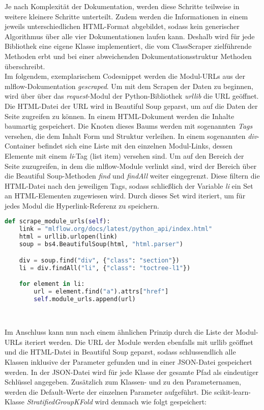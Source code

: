\documentclass[german,bachelor]{swsLeipzig}
\begin{document}
Je nach Komplexität der Dokumentation, werden diese Schritte teilweise in weitere kleinere Schritte unterteilt.
Zudem werden die Informationen in einem jeweils unterschiedlichen HTML-Format abgebildet,
sodass kein generischer Algorithmus über alle vier Dokumentationen laufen kann.
Deshalb wird für jede Bibliothek eine eigene Klasse implementiert, die vom ClassScraper zielführende Methoden erbt und
bei einer abweichenden Dokumentationsstruktur Methoden überschreibt. \\

Im folgendem, exemplarischem Codesnippet werden die Modul-URLs aus der mlflow-Dokumentation \textit{gescraped}.
Um mit dem Scrapen der Daten zu beginnen, wird über über das \textit{request}-Modul der Python-Bibliothek \textit{urllib} die URL geöffnet.
Die HTML-Datei der URL wird in Beautiful Soup geparst, um auf die Daten der Seite zugreifen zu können.
In einem HTML-Dokument werden die Inhalte baumartig gespeichert.
Die Knoten dieses Baums werden mit sogenannten \textit{Tags} versehen, die dem Inhalt Form und Struktur verleihen.
In einem sogenannten \textit{div}-Container befindet sich eine Liste mit den einzelnen Modul-Links, dessen Elemente mit
einem \textit{li}-Tag (list item) versehen sind.
Um auf den Bereich der Seite zuzugreifen, in dem die mlflow-Module verlinkt sind, wird der Bereich über die Beautiful Soup-Methoden
\textit{find} und \textit{findAll} weiter eingegrenzt.
Diese filtern die HTML-Datei nach den jeweiligen Tags, sodass schließlich der Variable \textit{li} ein Set an HTML-Elementen
zugewiesen wird.
Durch dieses Set wird iteriert, um für jedes Modul die Hyperlink-Referenz zu speichern.\\

\begin{lstlisting}[language=Python, frame=single, basicstyle=\small]
def scrape_module_urls(self):
    link = "mlflow.org/docs/latest/python_api/index.html"
    html = urllib.urlopen(link)
    soup = bs4.BeautifulSoup(html, "html.parser")

    div = soup.find("div", {"class": "section"})
    li = div.findAll("li", {"class": "toctree-l1"})

    for element in li:
        url = element.find("a").attrs["href"]
        self.module_urls.append(url)
\end{lstlisting}
\

Im Anschluss kann nun nach einem ähnlichen Prinzip durch die Liste der Modul-URLs iteriert werden.
Die URL der Module werden ebenfalls mit urllib geöffnet und die HTML-Datei in Beautiful Soup geparst, sodass
schlussendlich alle Klassen inklusive der Parameter gefunden und in einer JSON-Datei gespeichert werden.
In der JSON-Datei wird für jede Klasse der gesamte Pfad als eindeutiger Schlüssel angegeben.
Zusätzlich zum Klassen- und zu den Parameternamen, werden die Default-Werte der einzelnen Parameter aufgeführt.
Die scikit-learn-Klasse \textit{StratifiedGroupKFold} wird demnach wie folgt gespeichert:\\
\end{document}
